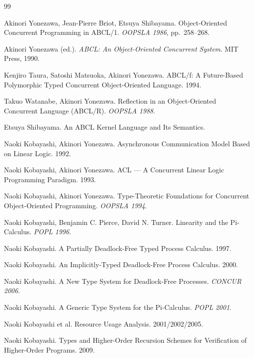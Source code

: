 \documentclass[11pt,a4paper]{ltjsarticle}
\theoremstyle{definition}
\theoremstyle{remark}
\begin{document}
\begin{thebibliography}{99}

Akinori Yonezawa, Jean-Pierre Briot, Etsuya Shibayama.
\newblock Object-Oriented Concurrent Programming in ABCL/1.
\newblock \emph{OOPSLA 1986}, pp.~258--268.

Akinori Yonezawa (ed.).
\newblock \emph{ABCL: An Object-Oriented Concurrent System}.
\newblock MIT Press, 1990.

Kenjiro Taura, Satoshi Matsuoka, Akinori Yonezawa.
\newblock ABCL/f: A Future-Based Polymorphic Typed Concurrent
Object-Oriented Language. 1994.

Takuo Watanabe, Akinori Yonezawa.
\newblock Reflection in an Object-Oriented Concurrent Language (ABCL/R).
\newblock \emph{OOPSLA 1988}.

Etsuya Shibayama.
\newblock An ABCL Kernel Language and Its Semantics.

Naoki Kobayashi, Akinori Yonezawa.
\newblock Asynchronous Communication Model Based on Linear Logic. 1992.

Naoki Kobayashi, Akinori Yonezawa.
\newblock ACL --- A Concurrent Linear Logic Programming Paradigm. 1993.

Naoki Kobayashi, Akinori Yonezawa.
\newblock Type-Theoretic Foundations for Concurrent Object-Oriented
Programming.
\newblock \emph{OOPSLA 1994}.

Naoki Kobayashi, Benjamin C. Pierce, David N. Turner.
\newblock Linearity and the Pi-Calculus.
\newblock \emph{POPL 1996}.

Naoki Kobayashi.
\newblock A Partially Deadlock-Free Typed Process Calculus. 1997.

Naoki Kobayashi.
\newblock An Implicitly-Typed Deadlock-Free Process Calculus. 2000.

Naoki Kobayashi.
\newblock A New Type System for Deadlock-Free Processes.
\newblock \emph{CONCUR 2006}.

Naoki Kobayashi.
\newblock A Generic Type System for the Pi-Calculus.
\newblock \emph{POPL 2001}.

Naoki Kobayashi et al.
\newblock Resource Usage Analysis. 2001/2002/2005.

Naoki Kobayashi.
\newblock Types and Higher-Order Recursion Schemes for Verification of
Higher-Order Programs. 2009.


\end{thebibliography}
\end{document}
